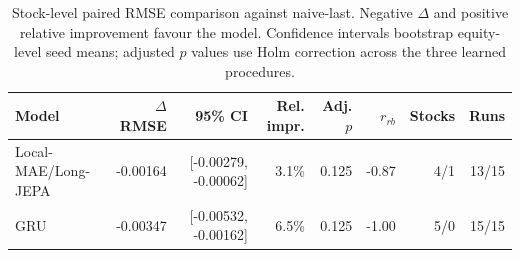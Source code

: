 \begin{table}[t]
\centering
\small
\caption{Stock-level paired RMSE comparison against naive-last. Negative $\Delta$ and positive relative improvement favour the model. Confidence intervals bootstrap equity-level seed means; adjusted $p$ values use Holm correction across the three learned procedures.}
\label{tab:paired_rmse_naive}
\begin{tabular}{lrrrrrrr}
\toprule
Model & $\Delta$RMSE & 95\% CI & Rel. impr. & Adj. $p$ & $r_{rb}$ & Stocks & Runs \\
\midrule
Local-MAE/Long-JEPA & -0.00164 & [-0.00279, -0.00062] & 3.1\% & 0.125 & -0.87 & 4/1 & 13/15 \\
GRU & -0.00347 & [-0.00532, -0.00162] & 6.5\% & 0.125 & -1.00 & 5/0 & 15/15 \\
\bottomrule
\end{tabular}
\end{table}

